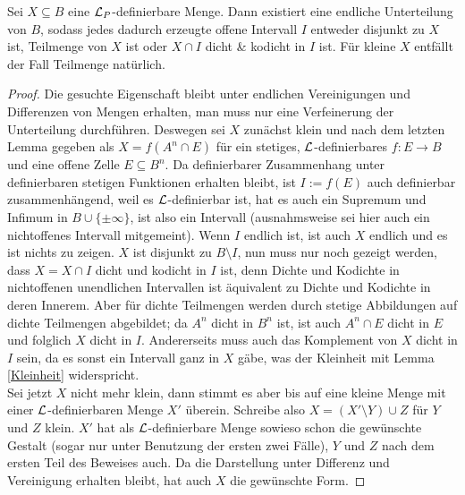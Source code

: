 \begin{theorem}\label{Satz 4}
	Sei $X\subseteq B$ eine $\mathcal{L}_P$-definierbare Menge. Dann existiert eine endliche Unterteilung von $B$, sodass jedes dadurch erzeugte offene Intervall $I$ entweder disjunkt zu $X$ ist, Teilmenge von $X$ ist oder $X\cap I$ dicht \& kodicht in $I$ ist. Für kleine $X$ entfällt der Fall \glqq{}Teilmenge\grqq{} natürlich.
\end{theorem}
\begin{proof}
	Die gesuchte Eigenschaft bleibt unter endlichen Vereinigungen und Differenzen von Mengen erhalten, man muss nur eine Verfeinerung der Unterteilung durchführen. Deswegen sei $X$ zunächst klein und nach dem letzten Lemma gegeben als $X=f(A^n\cap E)$ für ein stetiges, $\mathcal{L}$-definierbares $f:E\rightarrow B$ und eine offene Zelle $E\subseteq B^n$. Da definierbarer Zusammenhang unter definierbaren stetigen Funktionen erhalten bleibt, ist $I:=f(E)$ auch definierbar zusammenhängend, weil es $\mathcal{L}$-definierbar ist, hat es auch ein Supremum und Infimum in $B\cup\{\pm\infty\}$, ist also ein Intervall (ausnahmsweise sei hier auch ein nichtoffenes Intervall mitgemeint). Wenn $I$ endlich ist, ist auch $X$ endlich und es ist nichts zu zeigen. $X$ ist disjunkt zu $B\setminus I$, nun muss nur noch gezeigt werden, dass $X=X\cap I$ dicht und kodicht in $I$ ist, denn Dichte und Kodichte in nichtoffenen unendlichen Intervallen ist äquivalent zu Dichte und Kodichte in deren Innerem. Aber für dichte Teilmengen werden durch stetige Abbildungen auf dichte Teilmengen abgebildet; da $A^n$ dicht in $B^n$ ist, ist auch $A^n\cap E$ dicht in $E$ und folglich $X$ dicht in $I$. Andererseits muss auch das Komplement von $X$ dicht in $I$ sein, da es sonst ein Intervall ganz in $X$ gäbe, was der Kleinheit mit Lemma \ref{Kleinheit} widerspricht.\\
	Sei jetzt $X$ nicht mehr klein, dann stimmt es aber bis auf eine kleine Menge mit einer $\mathcal{L}$-definierbaren Menge $X'$ überein. Schreibe also $X=(X'\setminus Y)\cup Z$ für $Y$ und $Z$ klein. $X'$ hat als $\mathcal{L}$-definierbare Menge sowieso schon die gewünschte Gestalt (sogar nur unter Benutzung der ersten zwei Fälle), $Y$ und $Z$ nach dem ersten Teil des Beweises auch. Da die Darstellung unter Differenz und Vereinigung erhalten bleibt, hat auch $X$ die gewünschte Form.
\end{proof}

